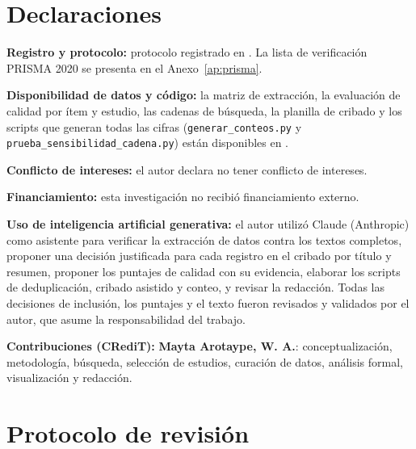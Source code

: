 \documentclass[12pt, a4paper]{article}
\begin{document}
\section*{Declaraciones}

\textbf{Registro y protocolo:} protocolo registrado en \RegistroOSF. La lista de verificaci\'{o}n PRISMA 2020 se presenta en el Anexo~\ref{ap:prisma}.

\textbf{Disponibilidad de datos y c\'{o}digo:} la matriz de extracci\'{o}n, la evaluaci\'{o}n de calidad por \'{i}tem y estudio, las cadenas de b\'{u}squeda, la planilla de cribado y los scripts que generan todas las cifras (\texttt{generar\_conteos.py} y \texttt{prueba\_sensibilidad\_cadena.py}) est\'{a}n disponibles en \RepositorioDatos.

\textbf{Conflicto de intereses:} el autor declara no tener conflicto de intereses.

\textbf{Financiamiento:} esta investigaci\'{o}n no recibi\'{o} financiamiento externo.

\textbf{Uso de inteligencia artificial generativa:} el autor utiliz\'{o} Claude (Anthropic) como asistente para verificar la extracci\'{o}n de datos contra los textos completos, proponer una decisi\'{o}n justificada para cada registro en el cribado por t\'{i}tulo y resumen, proponer los puntajes de calidad con su evidencia, elaborar los scripts de deduplicaci\'{o}n, cribado asistido y conteo, y revisar la redacci\'{o}n. Todas las decisiones de inclusi\'{o}n, los puntajes y el texto fueron revisados y validados por el autor, que asume la responsabilidad del trabajo.

\textbf{Contribuciones (CRediT):} \textbf{Mayta Arotaype, W. A.}: conceptualizaci\'{o}n, metodolog\'{i}a, b\'{u}squeda, selecci\'{o}n de estudios, curaci\'{o}n de datos, an\'{a}lisis formal, visualizaci\'{o}n y redacci\'{o}n.




\appendix

\section{Protocolo de revisi\'{o}n}
\label{ap:protocolo}
\end{document}
